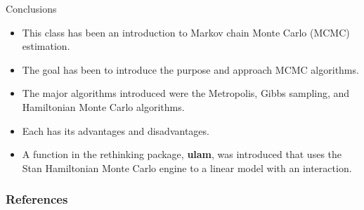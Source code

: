 \documentclass[handout]{beamer}
\begin{document}
\begin{frame}{Conclusions}
\scriptsize{

\begin{itemize}
\item This class has been an  introduction to Markov chain Monte Carlo (MCMC) estimation. 

\item The goal has been to introduce the purpose and approach MCMC algorithms.
\item The major algorithms introduced were the Metropolis, Gibbs sampling, and Hamiltonian
Monte Carlo algorithms.
\item Each has its advantages and disadvantages. 
\item A function in the rethinking package, \textbf{ulam}, was introduced that uses the Stan Hamiltonian Monte Carlo engine to a linear model with an interaction.
\end{itemize}


} 
\end{frame}


\begin{frame}[allowframebreaks]\scriptsize
\frametitle{References}


%
\end{frame}  









\end{document}
